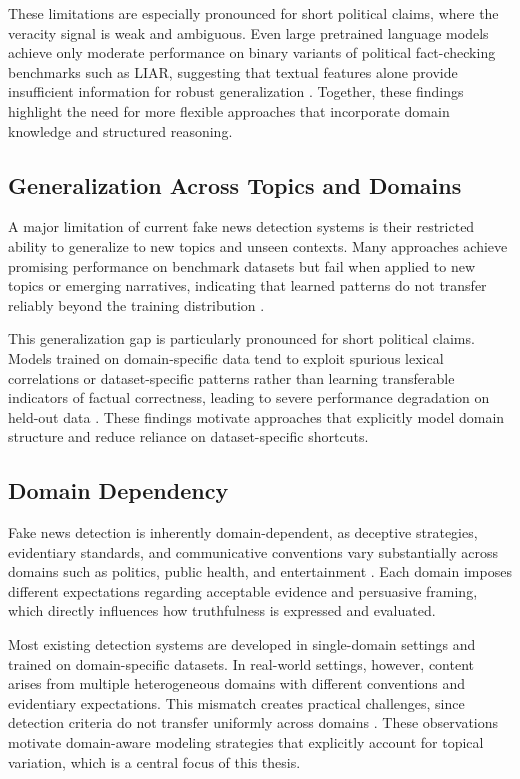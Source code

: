 These limitations are especially pronounced for short political claims, where the veracity signal is weak and ambiguous. Even large pretrained language models achieve only moderate performance on binary variants of political fact-checking benchmarks such as LIAR, suggesting that textual features alone provide insufficient information for robust generalization \cite{hasan2025generalizationgapspoliticalfake}. Together, these findings highlight the need for more flexible approaches that incorporate domain knowledge and structured reasoning.

\subsection{Generalization Across Topics and Domains}

A major limitation of current fake news detection systems is their restricted ability to generalize to new topics and unseen contexts. Many approaches achieve promising performance on benchmark datasets but fail when applied to new topics or emerging narratives, indicating that learned patterns do not transfer reliably beyond the training distribution \cite{tong-etal-2025-generate, fi16080298}.

This generalization gap is particularly pronounced for short political claims. Models trained on domain-specific data tend to exploit spurious lexical correlations or dataset-specific patterns rather than learning transferable indicators of factual correctness, leading to severe performance degradation on held-out data \cite{hasan2025generalizationgapspoliticalfake}. These findings motivate approaches that explicitly model domain structure and reduce reliance on dataset-specific shortcuts.

\subsection{Domain Dependency}

Fake news detection is inherently domain-dependent, as deceptive strategies, evidentiary standards, and communicative conventions vary substantially across domains such as politics, public health, and entertainment \cite{encyclopedia2010043}. Each domain imposes different expectations regarding acceptable evidence and persuasive framing, which directly influences how truthfulness is expressed and evaluated.

Most existing detection systems are developed in single-domain settings and trained on domain-specific datasets. In real-world settings, however, content arises from multiple heterogeneous domains with different conventions and evidentiary expectations. This mismatch creates practical challenges, since detection criteria do not transfer uniformly across domains \cite{tong2024mmdfnd}. These observations motivate domain-aware modeling strategies that explicitly account for topical variation, which is a central focus of this thesis.

